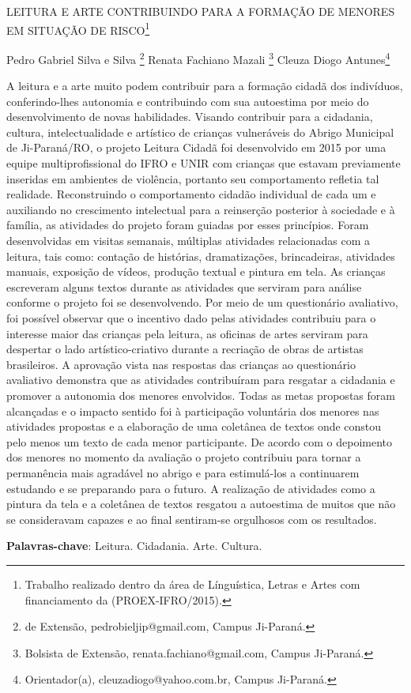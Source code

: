 \documentclass[article,12pt,onesidea,4paper,english,brazil]{abntex2}
\begin{document}
	
	
	\frenchspacing 
	
	\begin{center}
		\LARGE LEITURA E ARTE CONTRIBUINDO PARA A FORMAÇÃO DE MENORES EM SITUAÇÃO DE RISCO\footnote{Trabalho realizado dentro da área de Línguística, Letras e Artes com financiamento da (PROEX-IFRO/2015).}
		
		\normalsize
		Pedro Gabriel Silva e Silva \footnote{de Extensão, pedrobieljip@gmail.com, Campus Ji-Paraná.} 
		Renata Fachiano Mazali \footnote{Bolsista de Extensão, renata.fachiano@gmail.com, Campus Ji-Paraná.} 
		Cleuza Diogo Antunes\footnote{Orientador(a), cleuzadiogo@yahoo.com.br, Campus Ji-Paraná.} 
 
	\end{center}
	
	\noindent A leitura e a arte muito podem contribuir para a formação cidadã dos indivíduos, conferindo-lhes autonomia e contribuindo com sua autoestima por meio do desenvolvimento de novas habilidades. Visando contribuir para a cidadania, cultura, intelectualidade e artístico de crianças vulneráveis do Abrigo Municipal de Ji-Paraná/RO, o projeto Leitura Cidadã foi desenvolvido em 2015 por uma equipe multiprofissional do IFRO e UNIR com crianças que estavam previamente inseridas em ambientes de violência, portanto seu comportamento refletia tal realidade. Reconstruindo o comportamento cidadão individual de cada um e auxiliando no crescimento intelectual para a reinserção posterior à sociedade e à família, as atividades do projeto foram guiadas por esses princípios. Foram desenvolvidas em visitas semanais, múltiplas atividades relacionadas com a leitura, tais como: contação de histórias, dramatizações, brincadeiras, atividades manuais, exposição de vídeos, produção textual e pintura em tela. As crianças escreveram alguns textos durante as atividades que serviram para análise conforme o projeto foi se desenvolvendo. Por meio de um questionário avaliativo, foi possível observar que o incentivo dado pelas atividades contribuiu para o interesse maior das crianças pela leitura, as oficinas de artes serviram para despertar o lado artístico-criativo durante a recriação de obras de artistas brasileiros. A aprovação vista nas respostas das crianças ao questionário avaliativo demonstra que as atividades contribuíram para resgatar a cidadania e promover a autonomia dos menores envolvidos. Todas as metas propostas foram alcançadas e o impacto sentido foi à participação voluntária dos menores nas atividades propostas e a elaboração de uma coletânea de textos onde constou pelo menos um texto de cada menor participante. De acordo com o depoimento dos menores no momento da avaliação o projeto contribuiu para tornar a permanência mais agradável no abrigo e para estimulá-los a continuarem estudando e se preparando para o futuro. A realização de atividades como a pintura da tela e a coletânea de textos resgatou a autoestima de muitos que não se consideravam capazes e ao final sentiram-se orgulhosos com os resultados.
	
	\vspace{\onelineskip}
	
	\noindent
	\textbf{Palavras-chave}: Leitura. Cidadania. Arte. Cultura.
	
\end{document}
